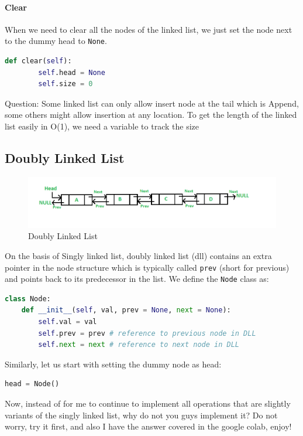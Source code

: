 \documentclass[../main.tex]{subfiles}
\begin{document}
\paragraph{Clear} When we need to clear all the nodes of the linked list, we just set the node next to the dummy head to \texttt{None}.
\begin{lstlisting}[language=Python]
    def clear(self):
        self.head = None
        self.size = 0
\end{lstlisting}

Question: Some linked list can only allow insert node at the tail which is Append, some others might allow insertion at any location. To get the length of the linked list easily in O(1), we need a variable to track the size


\subsection{Doubly Linked List}
\label{linked_list_subsec_doubly}
\begin{figure}[h]
    \centering
    \includegraphics[width=0.9\columnwidth]{fig/DLL1.png}
    \caption{Doubly Linked List}
    \label{fig:dll1}
\end{figure}
On the basis of Singly linked list, doubly linked list (dll) contains an extra pointer in the node structure which is typically called \texttt{prev} (short for previous) and points back to its predecessor in the list. We define the \texttt{Node} class as:
\begin{lstlisting}[language=Python]
class Node: 
    def __init__(self, val, prev = None, next = None): 
        self.val = val 
        self.prev = prev # reference to previous node in DLL
        self.next = next # reference to next node in DLL 
\end{lstlisting}
Similarly, let us start with setting the dummy node as head:
\begin{lstlisting}[language=Python]
head = Node()
\end{lstlisting}

Now, instead of for me to continue to implement all operations that are slightly variants of the singly linked list, why do not you guys implement it? Do not worry, try it first, and also I have the answer covered in the google colab, enjoy!
\end{document}
